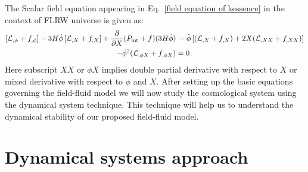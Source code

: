 \documentclass[a4paper,12pt]{article}
\newcommand{\p}{\ensuremath{\partial{}}}
\begin{document}
The Scalar field equation appearing in Eq.~\eqref{field equation of kessence} in the context of FLRW universe is given as:
\begin{multline}
\label{field kessence}
\left[ \mathcal{L}_{,\phi} + f_{,\phi}\right] - 3H\dot{\phi}\left[  \mathcal{L}_{,X} + f_{,X} \right] +  \dfrac{\p }{\p X} (P_{\rm int} +f ) (3H \dot{ \phi})\, -
\ddot{ \phi} \left[(\mathcal{L}_{,X} + f_{,X}) + 2X (\mathcal{L}_{,XX} + f_{,XX}) \right]  \\
-\dot{ \phi}^2 (\mathcal{L}_{,\phi X} + f_{,\phi X }) = 0\,.
\end{multline}
%
Here subscript $XX$ or $\phi X$ implies double partial derivative with respect to $X$ or mixed derivative with respect to $\phi$ and $X$.
After setting up the basic equations governing the field-fluid model we will now study the cosmological system using the dynamical system technique. This technique will help us to understand the dynamical stability of our proposed field-fluid model. 
\section{Dynamical systems approach}
\label{sec:4}	
	
\end{document}
